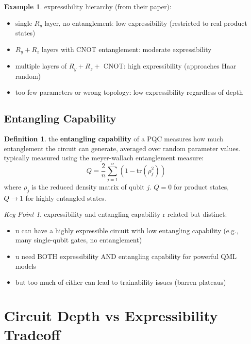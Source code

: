 \documentclass[11pt,a4paper]{article}
\theoremstyle{definition}
\newtheorem{definition}{Definition}[section]
\newtheorem{example}{Example}[section]
\theoremstyle{remark}
\newtheorem*{keypoint}{Key Point}
\begin{document}
\begin{example}
expressibility hierarchy (from their paper):
\begin{itemize}
    \item single $R_y$ layer, no entanglement: low expressibility (restricted to real product states)
    \item $R_y + R_z$ layers with CNOT entanglement: moderate expressibility
    \item multiple layers of $R_y + R_z + $ CNOT: high expressibility (approaches Haar random)
    \item too few parameters or wrong topology: low expressibility regardless of depth
\end{itemize}
\end{example}

\subsection{Entangling Capability}

\begin{definition}
the \textbf{entangling capability} of a PQC measures how much entanglement the circuit can generate, averaged over random parameter values. typically measured using the meyer-wallach entanglement measure:
\[
Q = \frac{2}{n}\sum_{j=1}^n \left(1 - \text{tr}(\rho_j^2)\right)
\]
where $\rho_j$ is the reduced density matrix of qubit $j$. $Q = 0$ for product states, $Q \to 1$ for highly entangled states.
\end{definition}

\begin{keypoint}
expressibility and entangling capability r related but distinct:
\begin{itemize}
    \item u can have a highly expressible circuit with low entangling capability (e.g., many single-qubit gates, no entanglement)
    \item u need BOTH expressibility AND entangling capability for powerful QML models
    \item but too much of either can lead to trainability issues (barren plateaus)
\end{itemize}
\end{keypoint}

\section{Circuit Depth vs Expressibility Tradeoff}
\end{document}
